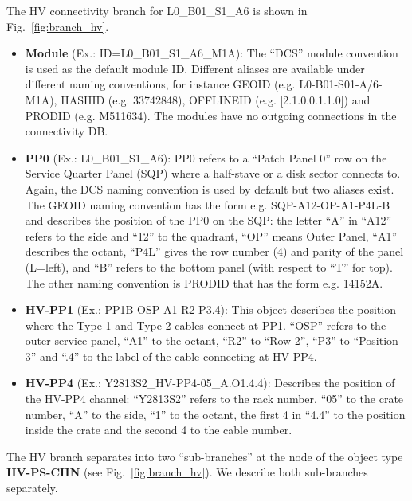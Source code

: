 The HV connectivity branch for L0\_B01\_S1\_A6 is shown in Fig.~\ref{fig:branch_hv}.%
%
\begin{itemize}
\item {\bf Module} (Ex.: ID=L0\_B01\_S1\_A6\_M1A): The ``DCS'' module convention is used as the default module ID. Different
aliases are available under different naming conventions, for instance GEOID (e.g. L0-B01-S01-A/6-M1A), HASHID (e.g. 33742848), 
OFFLINEID (e.g. [2.1.0.0.1.1.0]) and PRODID (e.g. M511634). The modules have no outgoing connections in the connectivity
DB.
\item {\bf PP0} (Ex.: L0\_B01\_S1\_A6): PP0 refers to a ``Patch Panel 0'' row on the Service Quarter Panel (SQP) where 
a half-stave or a disk sector connects to. Again, the DCS naming convention is used by default but two aliases exist.
The GEOID naming convention has the form e.g. SQP-A12-OP-A1-P4L-B and describes the position of the PP0 on the SQP: the letter ``A'' 
in ``A12'' refers to the side and ``12'' to the quadrant, ``OP'' means Outer Panel, ``A1'' describes the octant, ``P4L'' gives
the row number (4) and parity of the panel (L=left), and ``B'' refers to the bottom panel (with respect to ``T'' for top). The other 
naming convention is PRODID that has the form e.g. 14152A.
\item {\bf HV-PP1} (Ex.: PP1B-OSP-A1-R2-P3.4): This object describes the position where the Type 1 and Type 2 cables
connect at PP1. ``OSP'' refers
to the outer service panel, ``A1'' to the octant, ``R2'' to ``Row 2'', ``P3'' to ``Position 3'' and ``.4'' to the label
of the cable connecting at HV-PP4.
\item {\bf HV-PP4} (Ex.: Y2813S2\_HV-PP4-05\_A.O1.4.4): Describes the position of the HV-PP4 channel: ``Y2813S2'' refers
to the rack number, ``05'' to the crate number, ``A'' to the side, ``1'' to the octant, the first 4 in ``4.4''
to the position inside the crate and the second 4 to the cable number.
\end{itemize}

The HV branch separates into two ``sub-branches'' at the node of the object type {\bf HV-PS-CHN}
(see Fig.~\ref{fig:branch_hv}). We describe both sub-branches separately.

\vspace{0.5cm}

